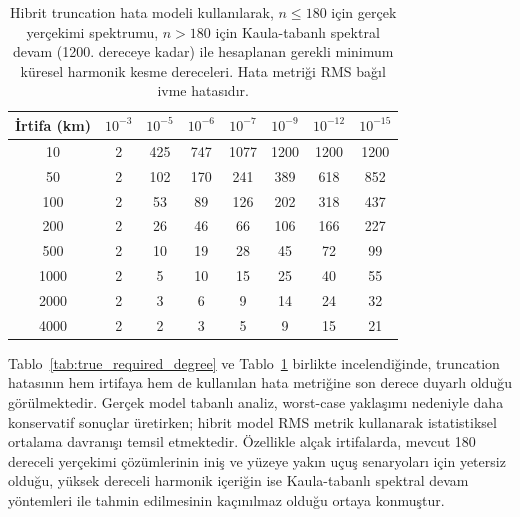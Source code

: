\begin{table}[H]
\centering
\caption{%
Hibrit truncation hata modeli kullanılarak,
$n \le 180$ için gerçek yerçekimi spektrumu,
$n > 180$ için Kaula-tabanlı spektral devam
(1200. dereceye kadar) ile hesaplanan
gerekli minimum küresel harmonik kesme
dereceleri.
Hata metriği RMS bağıl ivme hatasıdır.
}
\label{tab:hybrid_required_degree}
\begin{tabular}{c|ccccccc}
\hline
\textbf{İrtifa (km)} &
\textbf{$10^{-3}$} &
\textbf{$10^{-5}$} &
\textbf{$10^{-6}$} &
\textbf{$10^{-7}$} &
\textbf{$10^{-9}$} &
\textbf{$10^{-12}$} &
\textbf{$10^{-15}$} \\
\hline
10    & 2   & 425 & 747  & 1077 & 1200 & 1200 & 1200 \\
50    & 2   & 102 & 170  & 241  & 389  & 618  & 852  \\
100   & 2   & 53  & 89   & 126  & 202  & 318  & 437  \\
200   & 2   & 26  & 46   & 66   & 106  & 166  & 227  \\
500   & 2   & 10  & 19   & 28   & 45   & 72   & 99   \\
1000  & 2   & 5   & 10   & 15   & 25   & 40   & 55   \\
2000  & 2   & 3   & 6    & 9    & 14   & 24   & 32   \\
4000  & 2   & 2   & 3    & 5    & 9    & 15   & 21   \\
\hline
\end{tabular}
\end{table}




Tablo~\ref{tab:true_required_degree} ve
Tablo~\ref{tab:hybrid_required_degree} birlikte
incelendiğinde, truncation hatasının hem
irtifaya hem de kullanılan hata metriğine
son derece duyarlı olduğu görülmektedir.
Gerçek model tabanlı analiz, worst-case
yaklaşımı nedeniyle daha konservatif
sonuçlar üretirken; hibrit model RMS
metrik kullanarak istatistiksel ortalama
davranışı temsil etmektedir.
Özellikle alçak irtifalarda,
mevcut 180 dereceli yerçekimi çözümlerinin
iniş ve yüzeye yakın uçuş senaryoları için
yetersiz olduğu, yüksek dereceli harmonik
içeriğin ise Kaula-tabanlı spektral devam
yöntemleri ile tahmin edilmesinin
kaçınılmaz olduğu ortaya konmuştur.
